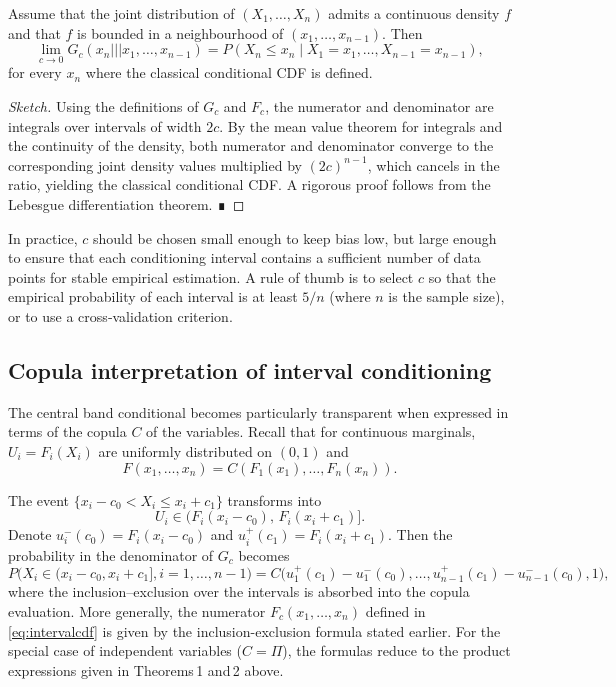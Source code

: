 \begin{theorem}
Assume that the joint distribution of $(X_1,\dots,X_n)$ admits a continuous density $f$ and that $f$ is bounded in a neighbourhood of $(x_1,\dots,x_{n-1})$. Then
\[
\lim_{c\to 0} G_c(x_n ||| x_1,\dots,x_{n-1}) = P(X_n \le x_n \mid X_1 = x_1,\dots,X_{n-1}=x_{n-1}),
\]
for every $x_n$ where the classical conditional CDF is defined.
\end{theorem}

\begin{proof}[Sketch]
Using the definitions of $G_c$ and $F_c$, the numerator and denominator are integrals over intervals of width $2c$. By the mean value theorem for integrals and the continuity of the density, both numerator and denominator converge to the corresponding joint density values multiplied by $(2c)^{n-1}$, which cancels in the ratio, yielding the classical conditional CDF. A rigorous proof follows from the Lebesgue differentiation theorem. ∎
\end{proof}

In practice, $c$ should be chosen small enough to keep bias low, but large enough to ensure that each conditioning interval contains a sufficient number of data points for stable empirical estimation. A rule of thumb is to select $c$ so that the empirical probability of each interval is at least $5/n$ (where $n$ is the sample size), or to use a cross‑validation criterion.

\subsection*{Copula interpretation of interval conditioning}

The central band conditional becomes particularly transparent when expressed in terms of the copula $C$ of the variables. Recall that for continuous marginals, $U_i = F_i(X_i)$ are uniformly distributed on $(0,1)$ and
\[
F(x_1,\dots,x_n) = C(F_1(x_1),\dots,F_n(x_n)).
\]

The event $\{x_i - c_0 < X_i \le x_i + c_1\}$ transforms into
\[
U_i \in \bigl( F_i(x_i - c_0),\, F_i(x_i + c_1) \bigr].
\]
Denote $u_i^-(c_0) = F_i(x_i - c_0)$ and $u_i^+(c_1) = F_i(x_i + c_1)$. Then the probability in the denominator of $G_c$ becomes
\[
P\bigl( X_i \in (x_i-c_0,x_i+c_1], i=1,\dots,n-1 \bigr) = C\bigl( u_1^+(c_1)-u_1^-(c_0),\dots, u_{n-1}^+(c_1)-u_{n-1}^-(c_0), 1 \bigr),
\]
where the inclusion–exclusion over the intervals is absorbed into the copula evaluation. More generally, the numerator $F_c(x_1,\dots,x_n)$ defined in \eqref{eq:intervalcdf} is given by the inclusion-exclusion formula stated earlier. For the special case of independent variables ($C = \Pi$), the formulas reduce to the product expressions given in Theorems 1 and 2 above.

